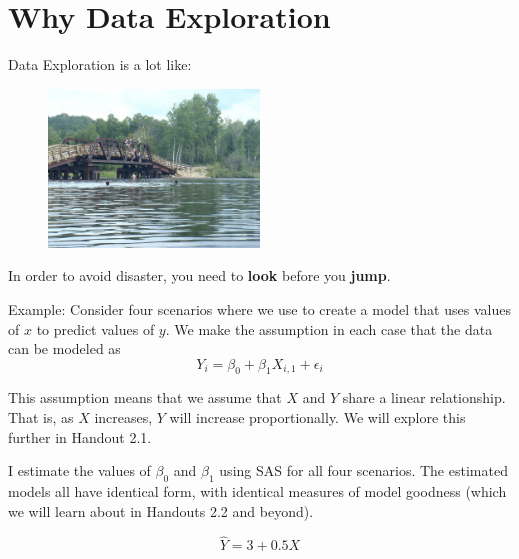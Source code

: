 \documentclass[12pt]{notes}
\begin{document}

\section{Why Data Exploration}

Data Exploration is a lot like:

\begin{figure}[H]
\centering
\includegraphics[width=0.5\textwidth]{figures/module1/bridgeJumping.jpg}
\end{figure}

In order to avoid disaster, you need to \textbf{look} before you \textbf{jump}.

\nspace
Example: 
Consider four scenarios where we use to create a model that uses values of $x$ to predict values of $y$. We make the assumption in each case that the data can be modeled as 
\begin{equation}
Y_i = \beta_0 + \beta_1X_{i,1} + \epsilon_i
\end{equation}

This assumption means that we assume that $X$ and $Y$ share a linear relationship. That is, as $X$ increases, $Y$ will increase proportionally. We will explore this further in Handout 2.1.

I estimate the values of $\beta_0$ and $\beta_1$ using SAS for all four scenarios. The estimated models all have identical form, with identical measures of model goodness (which we will learn about in Handouts 2.2 and beyond). 

\[\hat{Y} = 3 + 0.5X\]

\end{document}
